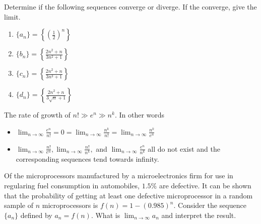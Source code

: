 \documentclass[12pt, a4paper]{article}
\begin{document}
\vspace{-1in}
\begin{ex}
  Determine if the following sequences converge or diverge. If the
  converge, give the limit.
  \begin{enumerate}
  \item \(\{a_n\} = \left\{ \left(\frac{1}{2}\right)^n \right\}\)
  \item \(\{b_n\} = \left\{ \frac{2n^2+n}{3n^2+1} \right\}\)
  \item \(\{c_n\} = \left\{ \frac{2n^2+n}{3n^3+1} \right\}\)
  \item \(\{d_n\} = \left\{ \frac{2n^2+n}{3\sqrt{n}+1} \right\}\)
  \end{enumerate}
\end{ex}
\vspace{-2in}
\begin{thrm}
  The rate of growth of \(n! \gg e^n \gg n^k\). In other words
  \begin{itemize}
  \item \(\lim_{n \to \infty} \frac{e^n}{n!} = 0 = \lim_{n \to \infty}
    \frac{n^k}{n!} = \lim_{n \to \infty} \frac{n^k}{e^n}\)
  \item \(\lim_{n \to \infty} \frac{n!}{e^n}, \lim_{n \to \infty}
    \frac{n!}{n^k},\) and \(\lim_{n \to \infty} \frac{e^n}{n^k}\) all
    do not exist and the corresponding sequences tend towards infinity.
  \end{itemize}
\end{thrm}
\vspace{-1in}
\begin{ex}
  Of the microprocessors manufactured by a microelectronics firm for
  use in regularing fuel consumption in automobiles, \(1.5\%\) are
  defective. It can be shown that the probability of getting at least
  one defective microprocessor in a random sample of \(n\)
  microprocessors is \(f(n) = 1-(0.985)^n\). Consider the sequence
  \(\{a_n\}\) defined by \(a_n = f(n)\). What is \(\lim_{n \to \infty}
  a_n\) and interpret the result.
\end{ex}
\vspace{-1in}
\end{document}
